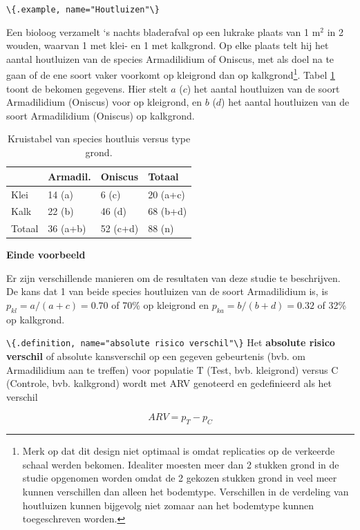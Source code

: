 \documentclass[
  12pt,dutch,coursenotes]{book}
\newcommand{\passthrough}[1]{#1}
\begin{document}
\passthrough{\lstinline!\{.example, name="Houtluizen"\}!}

Een bioloog verzamelt `s nachts bladerafval op een lukrake plaats van 1 m\(^2\)
in 2 wouden, waarvan 1 met klei- en 1 met kalkgrond. Op elke plaats telt hij het aantal houtluizen van de species
Armadilidium of Oniscus, met als doel na te gaan of de ene soort vaker voorkomt op kleigrond dan op
kalkgrond\footnote{Merk op dat dit design niet optimaal is omdat replicaties op de verkeerde schaal werden bekomen. Idealiter moesten meer dan 2 stukken grond in de studie opgenomen worden omdat de 2 gekozen stukken grond in veel meer kunnen verschillen dan alleen het bodemtype. Verschillen in de verdeling van houtluizen kunnen bijgevolg niet zomaar aan het bodemtype kunnen toegeschreven worden.}. Tabel \ref{tab:cox} toont de bekomen gegevens. Hier stelt \(a\) (\(c\)) het aantal houtluizen van de soort Armadilidium (Oniscus) voor op kleigrond, en \(b\) (\(d\)) het aantal houtluizen van de soort Armadilidium (Oniscus) op kalkgrond.

\begin{table}

\caption{\label{tab:cox}Kruistabel van species houtluis versus type grond.}
\centering
\begin{tabular}[t]{llll}
\toprule
  & Armadil. & Oniscus & Totaal\\
\midrule
Klei & 14 (a) & 6 (c) & 20 (a+c)\\
Kalk & 22 (b) & 46 (d) & 68 (b+d)\\
Totaal & 36 (a+b) & 52 (c+d) & 88 (n)\\
\bottomrule
\end{tabular}
\end{table}

\textbf{Einde voorbeeld}

Er zijn verschillende manieren om de resultaten van deze studie te
beschrijven. De kans dat 1 van beide species houtluizen van de soort Armadilidium is, is \(p_{kl}=a/(a+c)=0.70\) of 70\% op kleigrond en \(p_{ka}=b/(b+d)=0.32\) of 32\% op kalkgrond.

\passthrough{\lstinline!\{.definition, name="absolute risico verschil"\}!}
Het \textbf{absolute risico verschil} of absolute kansverschil op een gegeven gebeurtenis (bvb. om Armadilidium aan te treffen) voor populatie T (Test, bvb. kleigrond) versus C (Controle, bvb. kalkgrond) wordt
met ARV genoteerd en gedefinieerd als het verschil

\begin{equation*}
ARV=p_T-p_C
\end{equation*}
\end{document}
